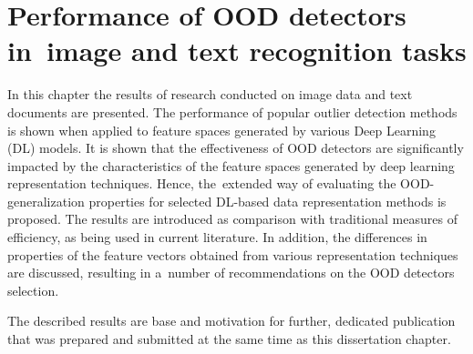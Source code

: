 \chapter{Performance of OOD detectors in~image and text recognition tasks}
\label{chapter:real-data}

In this chapter the results of research conducted on image data and text documents are presented. The performance of popular outlier detection methods is shown when applied to feature spaces generated by various Deep Learning (DL) models. It is shown that the effectiveness of OOD detectors are significantly impacted by the characteristics of the feature spaces generated by deep learning representation techniques. Hence, the~extended way of evaluating the OOD-generalization properties for selected DL-based data representation methods is proposed. The results are introduced as comparison with traditional measures of efficiency, as being used in current literature. In addition, the differences in properties of the feature vectors obtained from various representation techniques are discussed, resulting in a~number of recommendations on the OOD detectors selection.

The described results are base and motivation for further, dedicated publication \cite{Datko-2024} that was prepared and submitted at the same time as this dissertation chapter.

\cleardoublepage{}







